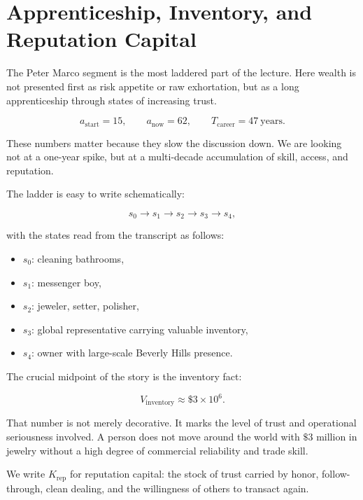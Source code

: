 \section{Apprenticeship, Inventory, and Reputation Capital}

The Peter Marco segment is the most laddered part of the lecture. Here wealth is not presented first as risk appetite or raw exhortation, but as a long apprenticeship through states of increasing trust.

\begin{equation}
a_{\mathrm{start}} = 15,\qquad a_{\mathrm{now}} = 62,\qquad T_{\mathrm{career}} = 47\ \mathrm{years}.
\end{equation}

These numbers matter because they slow the discussion down. We are looking not at a one-year spike, but at a multi-decade accumulation of skill, access, and reputation.

The ladder is easy to write schematically:

\begin{equation}
s_0 \rightarrow s_1 \rightarrow s_2 \rightarrow s_3 \rightarrow s_4,
\end{equation}

with the states read from the transcript as follows:
\begin{itemize}
\item \(s_0\): cleaning bathrooms,
\item \(s_1\): messenger boy,
\item \(s_2\): jeweler, setter, polisher,
\item \(s_3\): global representative carrying valuable inventory,
\item \(s_4\): owner with large-scale Beverly Hills presence.
\end{itemize}

The crucial midpoint of the story is the inventory fact:

\begin{equation}
V_{\mathrm{inventory}} \approx \$3\times 10^{6}.
\end{equation}

That number is not merely decorative. It marks the level of trust and operational seriousness involved. A person does not move around the world with \(\$3\) million in jewelry without a high degree of commercial reliability and trade skill.

\begin{definition}
We write \(K_{\mathrm{rep}}\) for reputation capital: the stock of trust carried by honor, follow-through, clean dealing, and the willingness of others to transact again.
\end{definition}

